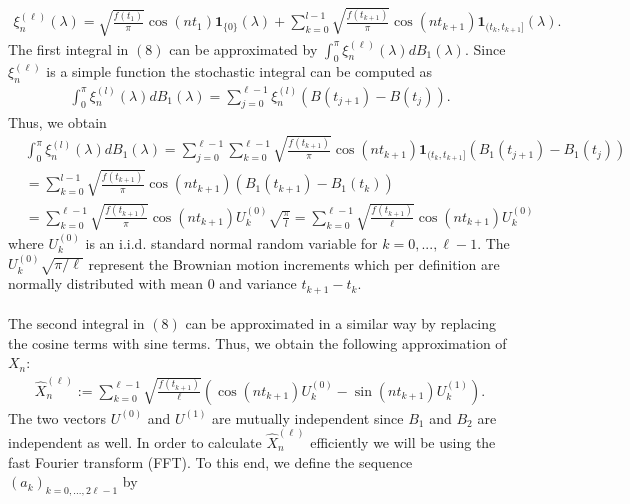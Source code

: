 \documentclass{article}
\begin{document}
\begin{align}
\xi_n^{(\ell)}(\lambda)= \sqrt{\frac{f(t_1)}{\pi}}\cos(nt_1)\mathbf{1}_{\{0\}}(\lambda)+\sum_{k=0}^{l-1} \sqrt{\frac{f(t_{k+1})}{\pi}}\cos(nt_{k+1})\mathbf{1}_{(t_k,t_{k+1}]}(\lambda).
\end{align}
The first integral in $(8)$ can be approximated by $\int_0^\pi \xi_n^{(\ell)}(\lambda)dB_1(\lambda)$. Since $\xi_n^{(\ell)}$ is a simple function the stochastic integral can be computed as
\begin{align}
\int_0^\pi \xi_n^{(l)}(\lambda)dB_1(\lambda) = \sum _{j=0}^{\ell-1} \xi_n^{(l)} (B(t_{j+1})-B(t_j)).
\end{align} 
Thus, we obtain 
\begin{align*}
&\int_0^\pi \xi_n^{(l)}(\lambda)dB_1(\lambda) = \sum_{j=0}^{\ell-1}\sum_{k=0}^{\ell-1} \sqrt{\frac{f(t_{k+1})}{\pi}} \cos(n t_{k+1}) \mathbf{1}_{(t_k,t_{k+1}]}(B_1(t_{j+1})-B_1(t_j))\\
&= \sum_{k=0}^{l-1} \sqrt{\frac{f(t_{k+1})}{\pi}} \cos(n t_{k+1}) 
(B_1(t_{k+1})-B_1(t_k)) \\
&= \sum_{k=0}^{\ell-1} \sqrt{\frac{f(t_{k+1})}{\pi}} \cos(n t_{k+1})U_k^{(0)} \sqrt{\frac{\pi}{l}} = \sum_{k=0}^{\ell-1} \sqrt{\frac{f(t_{k+1})}{\ell}} \cos(n t_{k+1})U_k^{(0)} \label{eq:sim_xn}
\end{align*}
where $U_k^{(0)}$ is an i.i.d. standard normal random variable for $k=0,...,\ell-1$. The $U_k^{(0)}\sqrt{\pi/\ell}$ represent the Brownian motion increments which per definition are normally distributed with mean $0$ and variance $t_{k+1}-t_k$.\\\\
The second integral in $(8)$ can be approximated in a similar way by replacing the cosine terms with sine terms. Thus, we obtain the following approximation of $X_n$:
\begin{align}
\hat{X}_n^{(\ell)} := \sum_{k=0}^{\ell-1} \sqrt{\frac{f(t_{k+1})}{\ell}}\left( \cos(nt_{k+1})U_k^{(0)}-\sin (nt_{k+1}) U_k^{(1)}\right).
\end{align}
The two vectors $U^{(0)}$ and $U^{(1)}$ are mutually independent since $B_1$ and $B_2$ are independent as well. In order to calculate $\hat{X}_n^{(\ell)}$ efficiently we will be using the fast Fourier transform (FFT). To this end, we define the sequence $(a_k)_{k=0,...,2\ell-1}$ by
\end{document}
